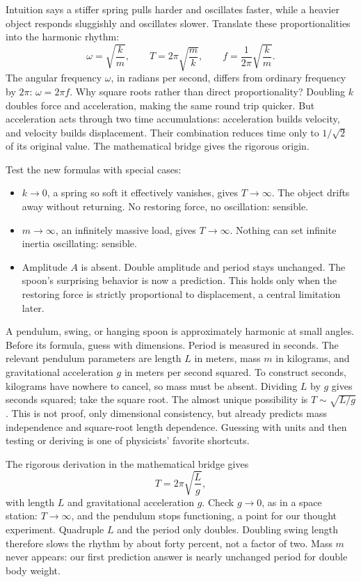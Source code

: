 Intuition says a stiffer spring pulls harder and oscillates faster, while a heavier object responds sluggishly and oscillates slower. Translate these proportionalities into the harmonic rhythm:
\[
  \omega=\sqrt{\frac{k}{m}},\qquad
  T=2\pi\sqrt{\frac{m}{k}},\qquad
  f=\frac{1}{2\pi}\sqrt{\frac{k}{m}}.
\]
The angular frequency \(\omega\), in radians per second, differs from ordinary frequency by \(2\pi\): \(\omega=2\pi f\). Why square roots rather than direct proportionality? Doubling \(k\) doubles force and acceleration, making the same round trip quicker. But acceleration acts through two time accumulations: acceleration builds velocity, and velocity builds displacement. Their combination reduces time only to \(1/\sqrt{2}\) of its original value. The mathematical bridge gives the rigorous origin.

Test the new formulas with special cases:

\begin{itemize}[leftmargin=2em]
  \item \(k\to 0\), a spring so soft it effectively vanishes, gives \(T\to\infty\). The object drifts away without returning. No restoring force, no oscillation: sensible.
  \item \(m\to\infty\), an infinitely massive load, gives \(T\to\infty\). Nothing can set infinite inertia oscillating: sensible.
  \item Amplitude \(A\) is absent. Double amplitude and period stays unchanged. The spoon's surprising behavior is now a prediction. This holds only when the restoring force is strictly proportional to displacement, a central limitation later.
\end{itemize}

A pendulum, swing, or hanging spoon is approximately harmonic at small angles. Before its formula, guess with dimensions. Period is measured in seconds. The relevant pendulum parameters are length \(L\) in meters, mass \(m\) in kilograms, and gravitational acceleration \(g\) in meters per second squared. To construct seconds, kilograms have nowhere to cancel, so mass must be absent. Dividing \(L\) by \(g\) gives seconds squared; take the square root. The almost unique possibility is \(T\sim\sqrt{L/g}\). This is not proof, only dimensional consistency, but already predicts mass independence and square-root length dependence. Guessing with units and then testing or deriving is one of physicists' favorite shortcuts.

The rigorous derivation in the mathematical bridge gives
\[
  T=2\pi\sqrt{\frac{L}{g}},
\]
with length \(L\) and gravitational acceleration \(g\). Check \(g\to 0\), as in a space station: \(T\to\infty\), and the pendulum stops functioning, a point for our thought experiment. Quadruple \(L\) and the period only doubles. Doubling swing length therefore slows the rhythm by about forty percent, not a factor of two. Mass \(m\) never appears: our first prediction answer is nearly unchanged period for double body weight.

